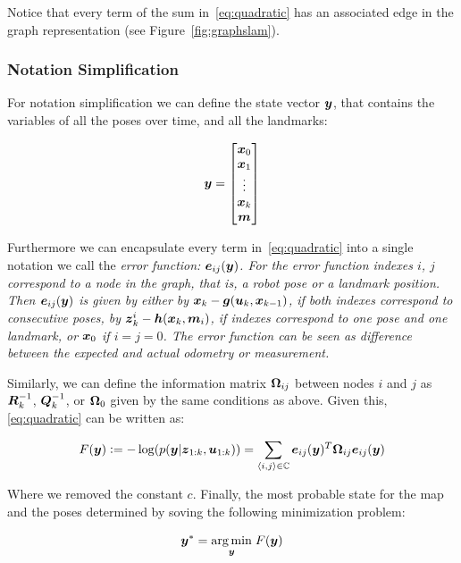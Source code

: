 Notice that every term of the sum in~\eqref{eq:quadratic} has an associated edge in the graph representation (see Figure~\ref{fig:graphslam}). 

\subsubsection{Notation Simplification}

For notation simplification we can define the state vector $\boldsymbol{y}$, that contains the variables of all the poses over time, and all the landmarks:

\begin{equation}
\boldsymbol{y} = \begin{bmatrix}
\boldsymbol{x}_0\\
\boldsymbol{x}_1\\
\vdots\\
\boldsymbol{x}_k\\
\boldsymbol{m}
\end{bmatrix}
\end{equation}

Furthermore we can encapsulate every term in~\eqref{eq:quadratic} into a single notation we call the \it{error function}: $\boldsymbol{e}_{ij}(\boldsymbol{y})$. For the error function indexes $i$, $j$ correspond to a node in the graph, that is, a robot pose or a landmark position. Then $\boldsymbol{e}_{ij}(\boldsymbol{y})$ is given by either by $\boldsymbol{x}_k-\boldsymbol{g}(\boldsymbol{u}_k,\boldsymbol{x}_{k-1})$, if both indexes correspond to consecutive poses, by $\boldsymbol{z}_k^i-\boldsymbol{h}(\boldsymbol{x}_k,\boldsymbol{m}_i)$, if indexes correspond to one pose and one landmark, or $\boldsymbol{x}_0$ if $i=j=0$. The error function can be seen as difference between the expected and actual odometry or measurement. 

Similarly, we can define the information matrix $\boldsymbol{\Omega}_{ij}$ between nodes $i$ and $j$ as $\boldsymbol{R}_k^{-1}$, $\boldsymbol{Q}_k^{-1}$, or $\boldsymbol{\Omega}_0$ given by the same conditions as above. Given this,\eqref{eq:quadratic} can be written as:

\begin{equation}
F(\boldsymbol{y}) \vcentcolon= -\log(p(\boldsymbol{y}|\boldsymbol{z}_{1:k},\boldsymbol{u}_{1:k})) = \sum_{\left<i,j\right>\in\mathbb{C}}\boldsymbol{e}_{ij}(\boldsymbol{y})^T\boldsymbol{\Omega}_{ij} \boldsymbol{e}_{ij}(\boldsymbol{y}) 
\label{eq:simplified}
\end{equation}

\noindent
Where we removed the constant $c$. Finally, the most probable state for the map and the poses determined by soving the following minimization problem: 

\begin{equation}
\boldsymbol{y}^* = \underset{\boldsymbol{y}}{\arg\min} \;F(\boldsymbol{y})
\label{eq:minimization}
\end{equation}


